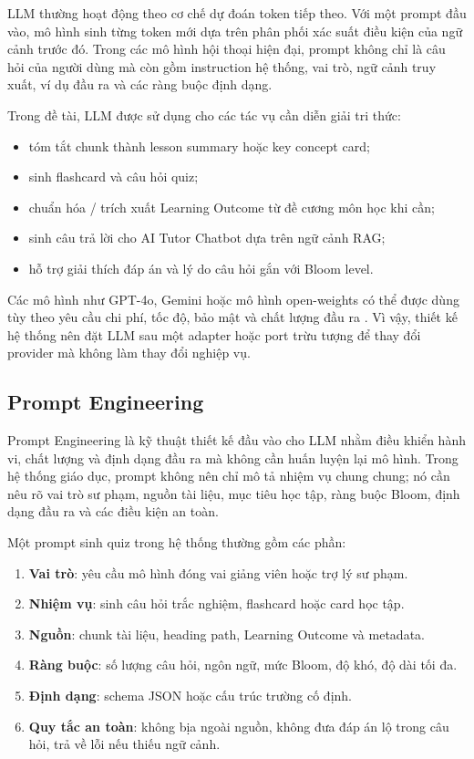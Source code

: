 LLM thường hoạt động theo cơ chế dự đoán token tiếp theo. Với một prompt đầu
vào, mô hình sinh từng token mới dựa trên phân phối xác suất điều kiện của
ngữ cảnh trước đó. Trong các mô hình hội thoại hiện đại, prompt không chỉ là
câu hỏi của người dùng mà còn gồm instruction hệ thống, vai trò, ngữ cảnh truy
xuất, ví dụ đầu ra và các ràng buộc định dạng.

Trong đề tài, LLM được sử dụng cho các tác vụ cần diễn giải tri thức:

\begin{itemize}
    \item tóm tắt chunk thành lesson summary hoặc key concept card;
    \item sinh flashcard và câu hỏi quiz;
    \item chuẩn hóa / trích xuất Learning Outcome từ đề cương môn học khi cần;
    \item sinh câu trả lời cho AI Tutor Chatbot dựa trên ngữ cảnh RAG;
    \item hỗ trợ giải thích đáp án và lý do câu hỏi gắn với Bloom level.
\end{itemize}

Các mô hình như GPT-4o, Gemini hoặc mô hình open-weights có thể được dùng tùy
theo yêu cầu chi phí, tốc độ, bảo mật và chất lượng đầu ra
\cite{openai2024gpt4o,google2024gemini}. Vì vậy, thiết kế hệ thống nên đặt
LLM sau một adapter hoặc port trừu tượng để thay đổi provider mà không làm
thay đổi nghiệp vụ.

\subsection{Prompt Engineering}
\label{subsec:prompt-engineering}

Prompt Engineering là kỹ thuật thiết kế đầu vào cho LLM nhằm điều khiển hành
vi, chất lượng và định dạng đầu ra mà không cần huấn luyện lại mô hình. Trong
hệ thống giáo dục, prompt không nên chỉ mô tả nhiệm vụ chung chung; nó cần nêu
rõ vai trò sư phạm, nguồn tài liệu, mục tiêu học tập, ràng buộc Bloom, định
dạng đầu ra và các điều kiện an toàn.

Một prompt sinh quiz trong hệ thống thường gồm các phần:

\begin{enumerate}
    \item \textbf{Vai trò}: yêu cầu mô hình đóng vai giảng viên hoặc trợ lý
          sư phạm.
    \item \textbf{Nhiệm vụ}: sinh câu hỏi trắc nghiệm, flashcard hoặc card học
          tập.
    \item \textbf{Nguồn}: chunk tài liệu, heading path, Learning Outcome và
          metadata.
    \item \textbf{Ràng buộc}: số lượng câu hỏi, ngôn ngữ, mức Bloom, độ khó,
          độ dài tối đa.
    \item \textbf{Định dạng}: schema JSON hoặc cấu trúc trường cố định.
    \item \textbf{Quy tắc an toàn}: không bịa ngoài nguồn, không đưa đáp án lộ
          trong câu hỏi, trả về lỗi nếu thiếu ngữ cảnh.
\end{enumerate}

